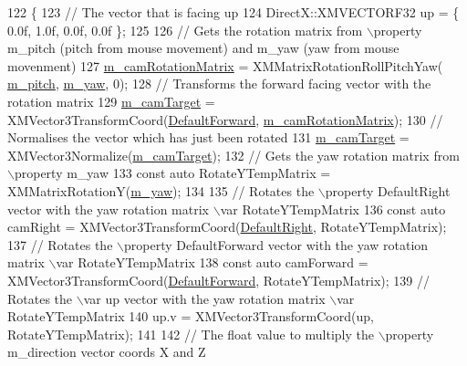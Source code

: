 \begin{DoxyCode}
122 \{
123     \textcolor{comment}{// The vector that is facing up}
124     DirectX::XMVECTORF32 up = \{ 0.0f, 1.0f, 0.0f, 0.0f \};
125 
126     \textcolor{comment}{// Gets the rotation matrix from \(\backslash\)property m\_pitch (pitch from mouse movement) and m\_yaw (yaw from
       mouse movenment)}
127     \mbox{\hyperlink{class_camera_helper_a995de11be349b7d74075f08fa5e2f437}{m\_camRotationMatrix}} = XMMatrixRotationRollPitchYaw(
      \mbox{\hyperlink{class_camera_helper_ae2a32d581a829b05300d7298b5622469}{m\_pitch}}, \mbox{\hyperlink{class_camera_helper_a9bdda4839839b4329188fc44517e8b01}{m\_yaw}}, 0);
128     \textcolor{comment}{// Transforms the forward facing vector with the rotation matrix}
129     \mbox{\hyperlink{class_camera_helper_abc1a814a0b54bfcb70f3e24bcd444f01}{m\_camTarget}} = XMVector3TransformCoord(\mbox{\hyperlink{class_camera_helper_a4f5d97db4f91d138f5ea4bf4416df132}{DefaultForward}}, 
      \mbox{\hyperlink{class_camera_helper_a995de11be349b7d74075f08fa5e2f437}{m\_camRotationMatrix}});
130     \textcolor{comment}{// Normalises the vector which has just been rotated}
131     \mbox{\hyperlink{class_camera_helper_abc1a814a0b54bfcb70f3e24bcd444f01}{m\_camTarget}} = XMVector3Normalize(\mbox{\hyperlink{class_camera_helper_abc1a814a0b54bfcb70f3e24bcd444f01}{m\_camTarget}});
132     \textcolor{comment}{// Gets the yaw rotation matrix from \(\backslash\)property m\_yaw}
133     \textcolor{keyword}{const} \textcolor{keyword}{auto} RotateYTempMatrix = XMMatrixRotationY(\mbox{\hyperlink{class_camera_helper_a9bdda4839839b4329188fc44517e8b01}{m\_yaw}});
134 
135     \textcolor{comment}{// Rotates the \(\backslash\)property DefaultRight vector with the yaw rotation matrix \(\backslash\)var RotateYTempMatrix}
136     \textcolor{keyword}{const} \textcolor{keyword}{auto} camRight = XMVector3TransformCoord(\mbox{\hyperlink{class_camera_helper_af4ca47176953088f0f18adecf7bf4409}{DefaultRight}}, RotateYTempMatrix);
137     \textcolor{comment}{// Rotates the \(\backslash\)property DefaultForward vector with the yaw rotation matrix \(\backslash\)var RotateYTempMatrix}
138     \textcolor{keyword}{const} \textcolor{keyword}{auto} camForward = XMVector3TransformCoord(\mbox{\hyperlink{class_camera_helper_a4f5d97db4f91d138f5ea4bf4416df132}{DefaultForward}}, RotateYTempMatrix);
139     \textcolor{comment}{// Rotates the \(\backslash\)var up vector with the yaw rotation matrix \(\backslash\)var RotateYTempMatrix}
140     up.v = XMVector3TransformCoord(up, RotateYTempMatrix);
141 
142     \textcolor{comment}{// The float value to multiply the \(\backslash\)property m\_direction vector coords X and Z}

\end{DoxyCode}
